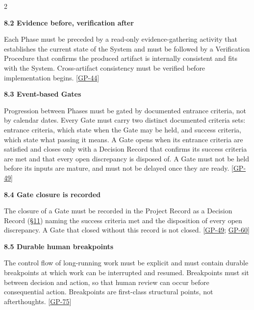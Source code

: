 \begin{multicols}{2}
\hypertarget{nss-8.2}{}

\par\smallskip\noindent\textbf{8.2 Evidence before, verification after}\par\nopagebreak

Each Phase must be preceded by a read-only evidence-gathering activity that establishes the current state of the System and must be followed by a Verification Procedure that confirms the produced artifact is internally consistent and fits with the System. Cross-artifact consistency must be verified before implementation begins. [\hyperlink{gp-44}{GP-44}]

\hypertarget{nss-8.3}{}

\par\smallskip\noindent\textbf{8.3 Event-based Gates}\par\nopagebreak

Progression between Phases must be gated by documented entrance criteria, not by calendar dates. Every Gate must carry two distinct documented criteria sets: entrance criteria, which state when the Gate may be held, and success criteria, which state what passing it means. A Gate opens when its entrance criteria are satisfied and closes only with a Decision Record that confirms its success criteria are met and that every open discrepancy is disposed of. A Gate must not be held before its inputs are mature, and must not be delayed once they are ready. [\hyperlink{gp-49}{GP-49}]

\hypertarget{nss-8.4}{}

\par\smallskip\noindent\textbf{8.4 Gate closure is recorded}\par\nopagebreak

The closure of a Gate must be recorded in the Project Record as a Decision Record (\hyperlink{nss-11}{\S11}) naming the success criteria met and the disposition of every open discrepancy. A Gate that closed without this record is not closed. [\hyperlink{gp-49}{GP-49}; \hyperlink{gp-60}{GP-60}]

\hypertarget{nss-8.5}{}

\par\smallskip\noindent\textbf{8.5 Durable human breakpoints}\par\nopagebreak

The control flow of long-running work must be explicit and must contain durable breakpoints at which work can be interrupted and resumed. Breakpoints must sit between decision and action, so that human review can occur before consequential action. Breakpoints are first-class structural points, not afterthoughts. [\hyperlink{gp-75}{GP-75}]


\end{multicols}
